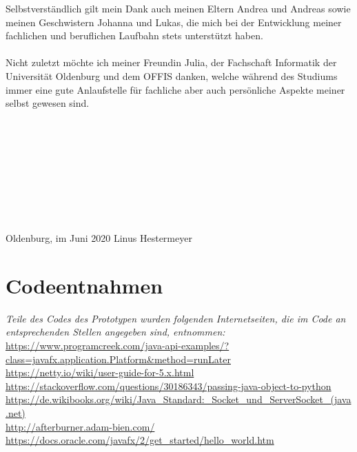 \documentclass{article}
\begin{document}
Selbstverständlich gilt mein Dank auch meinen Eltern Andrea und Andreas sowie meinen Geschwistern Johanna und Lukas, die mich bei der Entwicklung meiner fachlichen und beruflichen Laufbahn stets unterstützt haben.\\\\
Nicht zuletzt möchte ich meiner Freundin Julia, der Fachschaft Informatik der Universität Oldenburg und dem OFFIS danken, welche während des Studiums immer eine gute Anlaufstelle für fachliche aber auch persönliche Aspekte meiner selbst gewesen sind.\\\\\\\\\\\\\\\\\\\\
Oldenburg, im Juni 2020 \hspace{8.2cm}Linus Hestermeyer
\clearpage

\thispagestyle{empty}
\tableofcontents

\thispagestyle{empty}
\clearpage

\thispagestyle{empty}
\listoffigures
\clearpage

\clearpage


\clearpage

\clearpage


\section{Codeentnahmen}
\textit{Teile des Codes des Prototypen wurden folgenden Internetseiten, die im Code an entsprechenden Stellen angegeben sind, entnommen:}\\
\url{https://www.programcreek.com/java-api-examples/?class=javafx.application.Platform&method=runLater}\\	
\url{https://netty.io/wiki/user-guide-for-5.x.html}\\
\url{https://stackoverflow.com/questions/30186343/passing-java-object-to-python}\\
\url{https://de.wikibooks.org/wiki/Java_Standard:_Socket_und_ServerSocket_(java.net)}\\
\url{http://afterburner.adam-bien.com/}\\
\url{https://docs.oracle.com/javafx/2/get_started/hello_world.htm}\\
\end{document}
